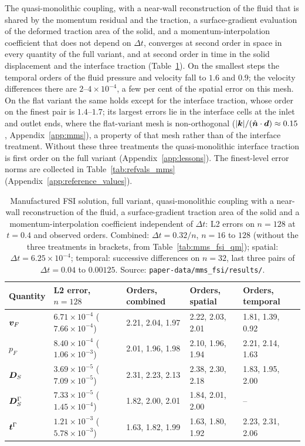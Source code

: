 The quasi-monolithic coupling, with a near-wall reconstruction of the fluid that is shared by the momentum residual and the traction, a surface-gradient evaluation of the deformed traction area of the solid, and a momentum-interpolation coefficient that does not depend on $\Delta t$, converges at second order in space in every quantity of the full variant, and at second order in time in the solid displacement and the interface traction (Table~\ref{tab:mms_fsi_corr}).
On the smallest steps the temporal orders of the fluid pressure and velocity fall to $1.6$ and $0.9$; the velocity differences there are $2$--$4\times10^{-4}$, a few per cent of the spatial error on this mesh.
On the flat variant the same holds except for the interface traction, whose order on the finest pair is $1.4$--$1.7$; its largest errors lie in the interface cells at the inlet and outlet ends, where the flat-variant mesh is non-orthogonal ($|\boldsymbol{k}|/(\hat{\boldsymbol{n}}\cdot\boldsymbol{d}) \approx 0.15$, Appendix~\ref{app:mms}), a property of that mesh rather than of the interface treatment.
Without these three treatments the quasi-monolithic interface traction is first order on the full variant (Appendix~\ref{app:lessons}).
The finest-level error norms are collected in Table~\ref{tab:refvals_mms} (Appendix~\ref{app:reference_values}).

\begin{table}[htbp]
	\centering
	\footnotesize
	\setlength{\tabcolsep}{4pt}
	\caption{Manufactured FSI solution, full variant, quasi-monolithic coupling with a near-wall reconstruction of the fluid, a surface-gradient traction area of the solid and a momentum-interpolation coefficient independent of $\Delta t$: L2 errors on $n = 128$ at $t = 0.4$ and observed orders. Combined: $\Delta t = 0.32/n$, $n = 16$ to $128$ (without the three treatments in brackets, from Table~\ref{tab:mms_fsi_qm}); spatial: $\Delta t = 6.25\times10^{-4}$; temporal: successive differences on $n = 32$, last three pairs of $\Delta t = 0.04$ to $0.00125$. Source: \texttt{paper-data/mms\_fsi/results/}.}
	\label{tab:mms_fsi_corr}
	\begin{tabular}{lllll}
		\toprule
		Quantity & L2 error, $n = 128$ & Orders, combined & Orders, spatial & Orders, temporal \\
		\midrule
		$\boldsymbol{v}_F$ & $6.71\times10^{-4}$ ($7.66\times10^{-4}$) & 2.21, 2.04, 1.97 & 2.22, 2.03, 2.01 & 1.81, 1.39, 0.92 \\
		$p_F$ & $8.40\times10^{-4}$ ($1.06\times10^{-3}$) & 2.01, 1.96, 1.98 & 2.10, 1.96, 1.94 & 2.21, 2.14, 1.63 \\
		$\boldsymbol{D}_S$ & $3.69\times10^{-5}$ ($7.09\times10^{-5}$) & 2.31, 2.23, 2.13 & 2.38, 2.30, 2.18 & 1.83, 1.95, 2.00 \\
		$\boldsymbol{D}_S^\Gamma$ & $7.33\times10^{-5}$ ($1.45\times10^{-4}$) & 1.82, 2.00, 2.01 & 1.84, 2.01, 2.00 & -- \\
		$\boldsymbol{t}^\Gamma$ & $1.21\times10^{-3}$ ($5.78\times10^{-3}$) & 1.63, 1.82, 1.99 & 1.63, 1.80, 1.92 & 2.23, 2.31, 2.06 \\
		\bottomrule
	\end{tabular}
\end{table}

